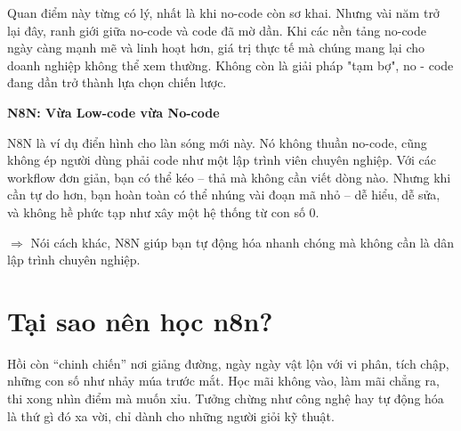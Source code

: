 Quan điểm này từng có lý, nhất là khi no-code còn sơ khai. Nhưng vài năm trở lại đây, ranh giới giữa no-code và code đã mờ dần. Khi các nền tảng no-code ngày càng mạnh mẽ và linh hoạt hơn, giá trị thực tế mà chúng mang lại cho doanh nghiệp không thể xem thường. Không còn là giải pháp "tạm bợ", no - code đang dần trở thành lựa chọn chiến lược.


\textbf{N8N: Vừa Low-code vừa No-code}

N8N là ví dụ điển hình cho làn sóng mới này. Nó không thuần no-code, cũng không ép người dùng phải code như một lập trình viên chuyên nghiệp. Với các workflow đơn giản, bạn có thể kéo – thả mà không cần viết dòng nào. Nhưng khi cần tự do hơn, bạn hoàn toàn có thể nhúng vài đoạn mã nhỏ – dễ hiểu, dễ sửa, và không hề phức tạp như xây một hệ thống từ con số 0.

$\Rightarrow$ Nói cách khác, N8N giúp bạn tự động hóa nhanh chóng mà không cần là dân lập trình chuyên nghiệp.




\newpage
\section{Tại sao nên học n8n?}

Hồi còn “chinh chiến” nơi giảng đường, ngày ngày vật lộn với vi phân, tích chập, những con số như nhảy múa trước mắt. Học mãi không vào, làm mãi chẳng ra, thi xong nhìn điểm mà muốn xỉu. Tưởng chừng như công nghệ hay tự động hóa là thứ gì đó xa vời, chỉ dành cho những người giỏi kỹ thuật.

